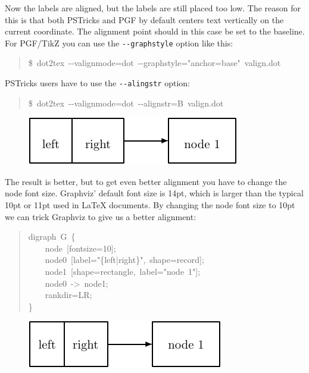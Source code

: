 \documentclass[10pt,a4paper,english]{article}
\begin{document}
Now the labels are aligned, but the labels are still placed too low. The reason for this is that both PSTricks and PGF by default centers text vertically on the current coordinate. The alignment point should in this case be set to the baseline. For PGF/TikZ you can use the \texttt{-{}-graphstyle} option like this:
\begin{quote}{\ttfamily \raggedright \noindent
{\$}~dot2tex~-{}-valignmode=dot~-{}-graphstyle="anchor=base"~valign.dot
}\end{quote}

PSTricks users have to use the \texttt{-{}-alingstr} option:
\begin{quote}{\ttfamily \raggedright \noindent
{\$}~dot2tex~-{}-valignmode=dot~-{}-alignstr=B~valign.dot
}\end{quote}
\begin{figure}[H]
\centering

\includegraphics{pdf/valignmode2}
\end{figure}

The result is better, but to get even better alignment you have to change the node font size. Graphviz' default font size is 14pt, which is larger than the typical 10pt or 11pt used in LaTeX documents. By changing the node font size to 10pt we can trick Graphviz to give us a better alignment:
\begin{quote}{\ttfamily \raggedright \noindent
digraph~G~{\{}~\\
~~~~node~{[}fontsize=10{]};~\\
~~~~node0~{[}label="{\{}left|right{\}}",~shape=record{]};~\\
~~~~node1~{[}shape=rectangle,~label="node~1"{]};~\\
~~~~node0~->~node1;~\\
~~~~rankdir=LR;~\\
{\}}
}\end{quote}
\begin{figure}[H]
\centering

\includegraphics{pdf/valignmode3}
\end{figure}
\end{document}
